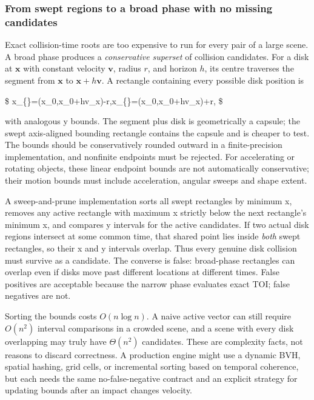 \subsubsection{From swept regions to a broad phase with no missing candidates}\label{04-visual-computing-ii-ch026-from-swept-regions-to-a-broad-phase-with-no-missing-candidates}

Exact collision-time roots are too expensive to run for every pair of a large scene. A broad phase produces a \emph{conservative superset} of collision candidates. For a disk at \(\mathbf x\) with constant velocity \(\mathbf v\), radius \(r\), and horizon \(h\), its centre traverses the segment from \(\mathbf x\) to \(\mathbf x+h\mathbf v\). A rectangle containing every possible disk position is

\$ x\_\{\min\}=\min(x\_0,x\_0+hv\_x)-r,\qquad x\_\{\max\}=\max(x\_0,x\_0+hv\_x)+r, \$

with analogous y bounds. The segment plus disk is geometrically a capsule; the swept axis-aligned bounding rectangle contains the capsule and is cheaper to test. The bounds should be conservatively rounded outward in a finite-precision implementation, and nonfinite endpoints must be rejected. For accelerating or rotating objects, these linear endpoint bounds are not automatically conservative; their motion bounds must include acceleration, angular sweeps and shape extent.

A sweep-and-prune implementation sorts all swept rectangles by minimum x, removes any active rectangle with maximum x strictly below the next rectangle's minimum x, and compares y intervals for the active candidates. If two actual disk regions intersect at some common time, that shared point lies inside \emph{both} swept rectangles, so their x and y intervals overlap. Thus every genuine disk collision must survive as a candidate. The converse is false: broad-phase rectangles can overlap even if disks move past different locations at different times. False positives are acceptable because the narrow phase evaluates exact TOI; false negatives are not.

Sorting the bounds costs \(O(n\log n)\). A naive active vector can still require \(O(n^2)\) interval comparisons in a crowded scene, and a scene with every disk overlapping may truly have \(\Theta(n^2)\) candidates. These are complexity facts, not reasons to discard correctness. A production engine might use a dynamic BVH, spatial hashing, grid cells, or incremental sorting based on temporal coherence, but each needs the same no-false-negative contract and an explicit strategy for updating bounds after an impact changes velocity.

